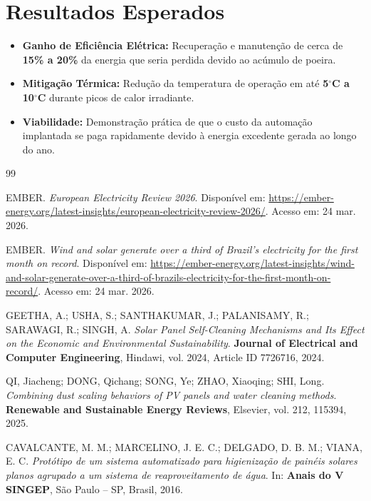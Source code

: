\documentclass[12pt, a4paper]{article}
\begin{document}
\section{Resultados Esperados}
\begin{itemize}
    \item \textbf{Ganho de Eficiência Elétrica:} Recuperação e manutenção de cerca de \textbf{15\% a 20\%} da energia que seria perdida devido ao acúmulo de poeira.
    \item \textbf{Mitigação Térmica:} Redução da temperatura de operação em até \textbf{5$^\circ$C a 10$^\circ$C} durante picos de calor irradiante.
    \item \textbf{Viabilidade:} Demonstração prática de que o custo da automação implantada se paga rapidamente devido à energia excedente gerada ao longo do ano.
\end{itemize}

\vspace{1cm}

\begin{thebibliography}{99}

EMBER.
\textit{European Electricity Review 2026}.
Disponível em: \url{https://ember-energy.org/latest-insights/european-electricity-review-2026/}. Acesso em: 24 mar. 2026.

EMBER.
\textit{Wind and solar generate over a third of Brazil's electricity for the first month on record}.
Disponível em: \url{https://ember-energy.org/latest-insights/wind-and-solar-generate-over-a-third-of-brazils-electricity-for-the-first-month-on-record/}. Acesso em: 24 mar. 2026.

GEETHA, A.; USHA, S.; SANTHAKUMAR, J.; PALANISAMY, R.; SARAWAGI, R.; SINGH, A. 
\textit{Solar Panel Self-Cleaning Mechanisms and Its Effect on the Economic and Environmental Sustainability}. 
\textbf{Journal of Electrical and Computer Engineering}, Hindawi, vol. 2024, Article ID 7726716, 2024.

QI, Jiacheng; DONG, Qichang; SONG, Ye; ZHAO, Xiaoqing; SHI, Long.
\textit{Combining dust scaling behaviors of PV panels and water cleaning methods}. 
\textbf{Renewable and Sustainable Energy Reviews}, Elsevier, vol. 212, 115394, 2025.

CAVALCANTE, M. M.; MARCELINO, J. E. C.; DELGADO, D. B. M.; VIANA, E. C.
\textit{Protótipo de um sistema automatizado para higienização de painéis solares planos agrupado a um sistema de reaproveitamento de água}. 
In: \textbf{Anais do V SINGEP}, São Paulo – SP, Brasil, 2016.

\end{thebibliography}
\end{document}
